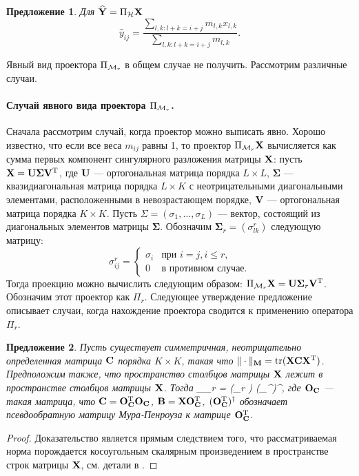 \documentclass[12pt,a4paper,fleqn,leqno]{article}
\DeclareMathOperator{\tr}{tr}
\newtheorem{proposition}{Предложение}%
\begin{document}
\begin{proposition}
Для $\widehat{\mathbf{Y}}=\Pi_{\mathcal{H}} \mathbf{X}$
\begin{equation*}
\hat{y}_{ij} = \frac{\sum_{l,k: l+k=i+j} m_{l,k} x_{l,k}}{\sum_{l,k: l+k=i+j} m_{l,k}}.
\end{equation*}
\end{proposition}

Явный вид проектора $\Pi_{\mathcal{M}_r}$ в общем случае не получить.
Рассмотрим различные случаи.

\paragraph{Случай явного вида проектора $\Pi_{\mathcal{M}_r}$.} Сначала рассмотрим случай, когда проектор можно выписать явно.
Хорошо известно, что если все веса $m_{ij}$ равны 1, то проектор $\Pi_{\mathcal{M}_r} \mathbf{X}$
вычисляется как сумма первых компонент сингулярного разложения матрицы $\mathbf{X}$: пусть $\mathbf{X} = \mathbf{U} \mathbf{\Sigma} \mathbf{V}^{\mathrm{T}}$, где $\mathbf{U}$ --- ортогональная матрица порядка $L \times L$, $\mathbf{\Sigma}$ --- квазидиагональная матрица порядка $L \times K$ с неотрицательными диагональными элементами, расположенными в невозрастающем порядке, $\mathbf{V}$ --- ортогональная матрица порядка $K \times K$. Пусть $\Sigma = (\sigma_1, \ldots, \sigma_L)$ --- вектор, состоящий из диагональных элементов матрицы $\mathbf{\Sigma}$. Обозначим $\mathbf{\Sigma}_r = (\sigma^r_{l k})$ следующую матрицу:
\begin{equation*}
\sigma^r_{i j} = \begin{cases}
\sigma_i & \text{при $i = j, i \le r,$}\\
0 & \text{в противном случае}.
\end{cases}
\end{equation*}
Тогда проекцию можно вычислить следующим образом: $\Pi_{\mathcal{M}_r} \mathbf{X}  = \mathbf{U} \mathbf{\Sigma}_r \mathbf{V}^{\mathrm{T}}$.
Обозначим этот проектор как $\Pi_r$.
Следующее утверждение предложение описывает случаи, когда нахождение проектора
сводится к применению оператора $\Pi_r$. %

\begin{proposition}
\label{prop:projS}
Пусть существует симметричная, неотрицательно определенная матрица  $\mathbf{C}$ порядка $K \times K$,
такая что $\|\cdot\|_\bfM = \tr(\bfX \bfC \bfX^\rmT)$.
Предположим также, что пространство столбцов матрицы $\mathbf{X}$ лежит в пространстве столбцов матрицы $\mathbf{X}$.
Тогда
\be
\label{eq:PiMr}
\Pi_{\calM_r} \bfX = (\Pi_r \bfB) (\bfO_\bfC^{\rmT})^\dagger,
\ee
где $\mathbf{O}_{\mathbf{C}}$ --- такая матрица, что $\mathbf{C} = \mathbf{O}_{\mathbf{C}}^{\mathrm{T}}\mathbf{O}_{\mathbf{C}}$,
$\mathbf{B} = \mathbf{X} \mathbf{O}_{\mathbf{C}}^{\mathrm{T}}$, $(\mathbf{O}_{\mathbf{C}}^{\mathrm{T}})^\dagger$ обозначает псевдообратную матрицу Мура-Пенроуза к матрице $\mathbf{O}_{\mathbf{C}}^{\mathrm{T}}$.
\end{proposition}
\begin{proof}
Доказательство является прямым следствием того, что рассматриваемая норма порождается косоугольным скалярным произведением в пространстве строк матрицы $\mathbf{X}$, см. детали в \cite{Golyandina2013}.
\end{proof}
\end{document}
